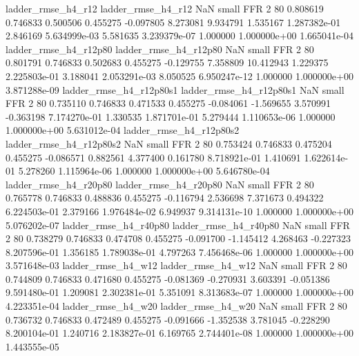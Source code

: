       ladder_rmse_h4_r12       ladder_rmse_h4_r12                   NaN      small      FFR                 2 80 0.808619       0.746833 0.500506       0.455275   -0.097805      8.273081      9.934791     1.535167   1.287382e-01  2.846169 5.634999e-03     5.581635   3.239379e-07            1.000000    1.000000e+00        1.665041e-04
   ladder_rmse_h4_r12p80    ladder_rmse_h4_r12p80                   NaN      small      FFR                 2 80 0.801791       0.746833 0.502683       0.455275   -0.129755      7.358809     10.412943     1.229375   2.225803e-01  3.188041 2.053291e-03     8.050525   6.950247e-12            1.000000    1.000000e+00        3.871288e-09
 ladder_rmse_h4_r12p80s1  ladder_rmse_h4_r12p80s1                   NaN      small      FFR                 2 80 0.735110       0.746833 0.471533       0.455275   -0.084061     -1.569655      3.570991    -0.363198   7.174270e-01  1.330535 1.871701e-01     5.279444   1.110653e-06            1.000000    1.000000e+00        5.631012e-04
 ladder_rmse_h4_r12p80s2  ladder_rmse_h4_r12p80s2                   NaN      small      FFR                 2 80 0.753424       0.746833 0.475204       0.455275   -0.086571      0.882561      4.377400     0.161780   8.718921e-01  1.410691 1.622614e-01     5.278260   1.115964e-06            1.000000    1.000000e+00        5.646780e-04
   ladder_rmse_h4_r20p80    ladder_rmse_h4_r20p80                   NaN      small      FFR                 2 80 0.765778       0.746833 0.488836       0.455275   -0.116794      2.536698      7.371673     0.494322   6.224503e-01  2.379166 1.976484e-02     6.949937   9.314131e-10            1.000000    1.000000e+00        5.076202e-07
   ladder_rmse_h4_r40p80    ladder_rmse_h4_r40p80                   NaN      small      FFR                 2 80 0.738279       0.746833 0.474708       0.455275   -0.091700     -1.145412      4.268463    -0.227323   8.207596e-01  1.356185 1.789038e-01     4.797263   7.456468e-06            1.000000    1.000000e+00        3.571648e-03
      ladder_rmse_h4_w12       ladder_rmse_h4_w12                   NaN      small      FFR                 2 80 0.744809       0.746833 0.471680       0.455275   -0.081369     -0.270931      3.603391    -0.051386   9.591480e-01  1.209081 2.302381e-01     5.351091   8.313683e-07            1.000000    1.000000e+00        4.223351e-04
      ladder_rmse_h4_w20       ladder_rmse_h4_w20                   NaN      small      FFR                 2 80 0.736732       0.746833 0.472489       0.455275   -0.091666     -1.352538      3.781045    -0.228290   8.200104e-01  1.240716 2.183827e-01     6.169765   2.744401e-08            1.000000    1.000000e+00        1.443555e-05
